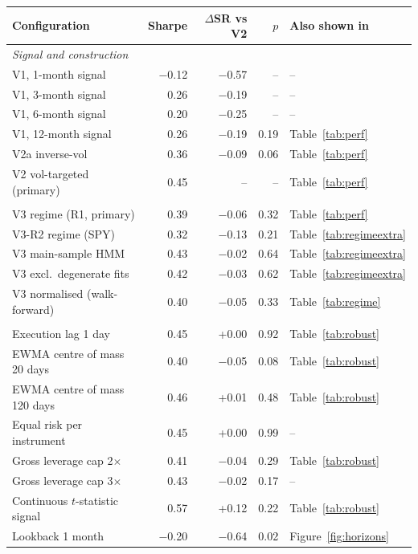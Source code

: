 \begin{tabular}{lrrrl}
\toprule
Configuration & Sharpe & $\Delta$SR vs V2 & $p$ & Also shown in \\
\midrule
\multicolumn{5}{l}{\textit{Signal and construction}} \\
V1, 1-month signal & $-$0.12 & $-$0.57 & -- & -- \\
V1, 3-month signal & 0.26 & $-$0.19 & -- & -- \\
V1, 6-month signal & 0.20 & $-$0.25 & -- & -- \\
V1, 12-month signal & 0.26 & $-$0.19 & 0.19 & Table~\ref{tab:perf} \\
V2a inverse-vol & 0.36 & $-$0.09 & 0.06 & Table~\ref{tab:perf} \\
V2 vol-targeted (primary) & 0.45 & -- & -- & Table~\ref{tab:perf} \\
\addlinespace
\multicolumn{5}{l}{\textit{Regime overlay}} \\
V3 regime (R1, primary) & 0.39 & $-$0.06 & 0.32 & Table~\ref{tab:perf} \\
V3-R2 regime (SPY) & 0.32 & $-$0.13 & 0.21 & Table~\ref{tab:regimeextra} \\
V3 main-sample HMM & 0.43 & $-$0.02 & 0.64 & Table~\ref{tab:regimeextra} \\
V3 excl.\ degenerate fits & 0.42 & $-$0.03 & 0.62 & Table~\ref{tab:regimeextra} \\
V3 normalised (walk-forward) & 0.40 & $-$0.05 & 0.33 & Table~\ref{tab:regime} \\
\addlinespace
\multicolumn{5}{l}{\textit{Robustness grid: V2 with one element changed}} \\
Execution lag 1 day & 0.45 & +0.00 & 0.92 & Table~\ref{tab:robust} \\
EWMA centre of mass 20 days & 0.40 & $-$0.05 & 0.08 & Table~\ref{tab:robust} \\
EWMA centre of mass 120 days & 0.46 & +0.01 & 0.48 & Table~\ref{tab:robust} \\
Equal risk per instrument & 0.45 & +0.00 & 0.99 & -- \\
Gross leverage cap 2$\times$ & 0.41 & $-$0.04 & 0.29 & Table~\ref{tab:robust} \\
Gross leverage cap 3$\times$ & 0.43 & $-$0.02 & 0.17 & -- \\
Continuous $t$-statistic signal & 0.57 & +0.12 & 0.22 & Table~\ref{tab:robust} \\
Lookback 1 month & $-$0.20 & $-$0.64 & 0.02 & Figure~\ref{fig:horizons} \\

\end{tabular}
